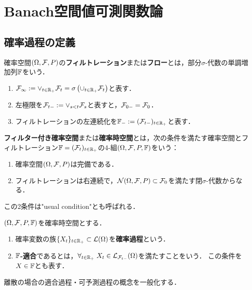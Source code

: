 \documentclass[uplatex,dvipdfmx]{jsreport}
\begin{document}
\section{Banach空間値可測関数論}

\subsection{確率過程の定義}

\begin{definition}
    確率空間$(\Omega,\mathcal{F},P)$の\textbf{フィルトレーション}または\textbf{フロー}\cite{LipsterShiryayev}とは，部分$\sigma$-代数の単調増加列$\mathbb{F}$をいう．
    \begin{enumerate}
        \item $\mathcal{F}_\infty:=\lor_{t\in\mathbb{R}_+}\mathcal{F}_t=\sigma\left(\cup_{t\in\mathbb{R}_+}\mathcal{F}_t\right)$と表す．
        \item 左極限を$\mathcal{F}_{t-}:=\lor_{s<t}\mathcal{F}_s$と表すと，$\mathcal{F}_{0-}=\mathcal{F}_0$．
        \item フィルトレーションの左連続化を$\mathbb{F}_-:=(\mathcal{F}_{t-})_{t\in\mathbb{R}_+}$と表す．
    \end{enumerate}
\end{definition}

\begin{definition}
    \textbf{フィルター付き確率空間}または\textbf{確率時空間}とは，次の条件を満たす確率空間とフィルトレーション$\mathbb{F}=(\mathcal{F}_t)_{t\in\mathbb{R}_+}$の4-組$(\Omega,\mathcal{F},P,\mathbb{F})$をいう：
    \begin{enumerate}
        \item 確率空間$(\Omega,\mathcal{F},P)$は完備である．
        \item フィルトレーションは右連続で，$\mathcal{N}(\Omega,\mathcal{F},P)\subset\mathcal{F}_0$を満たす閉$\sigma$-代数からなる．
    \end{enumerate}
    この2条件は"usual condition"とも呼ばれる．
\end{definition}

\begin{definition}
    $(\Omega,\mathcal{F},P,\mathbb{F})$を確率時空間とする．
    \begin{enumerate}
        \item 確率変数の族$\{X_t\}_{t\in\mathbb{R}_+}\subset\mathcal{L}(\Omega)$を\textbf{確率過程}という．
        \item \textbf{$\mathbb{F}$-適合}であるとは，$\forall_{t\in\mathbb{R}_+}\;X_t\in\mathcal{L}_{\mathcal{F}_{t-}}(\Omega)$を満たすことをいう．
        この条件を$X\in\mathbb{F}$とも表す．
    \end{enumerate}
    離散の場合の適合過程・可予測過程の概念を一般化する．
\end{definition}
\end{document}
